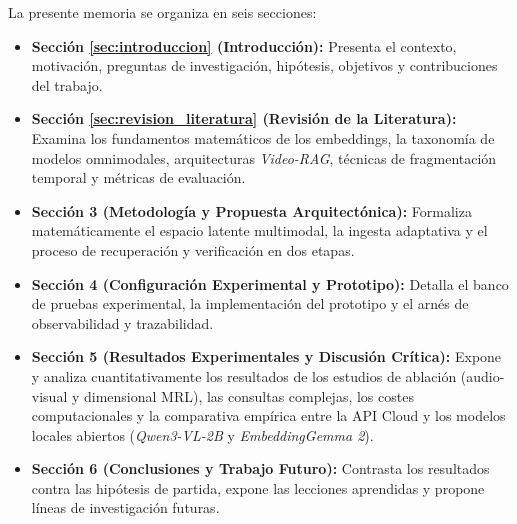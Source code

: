 La presente memoria se organiza en seis secciones:
\begin{itemize}
    \item \textbf{Sección \ref{sec:introduccion} (Introducción):} Presenta el contexto, motivación, preguntas de investigación, hipótesis, objetivos y contribuciones del trabajo.
    \item \textbf{Sección \ref{sec:revision_literatura} (Revisión de la Literatura):} Examina los fundamentos matemáticos de los embeddings, la taxonomía de modelos omnimodales, arquitecturas \textit{Video-RAG}, técnicas de fragmentación temporal y métricas de evaluación.
    \item \textbf{Sección 3 (Metodología y Propuesta Arquitectónica):} Formaliza matemáticamente el espacio latente multimodal, la ingesta adaptativa y el proceso de recuperación y verificación en dos etapas.
    \item \textbf{Sección 4 (Configuración Experimental y Prototipo):} Detalla el banco de pruebas experimental, la implementación del prototipo y el arnés de observabilidad y trazabilidad.
    \item \textbf{Sección 5 (Resultados Experimentales y Discusión Crítica):} Expone y analiza cuantitativamente los resultados de los estudios de ablación (audio-visual y dimensional MRL), las consultas complejas, los costes computacionales y la comparativa empírica entre la API Cloud y los modelos locales abiertos (\textit{Qwen3-VL-2B} y \textit{EmbeddingGemma 2}).
    \item \textbf{Sección 6 (Conclusiones y Trabajo Futuro):} Contrasta los resultados contra las hipótesis de partida, expone las lecciones aprendidas y propone líneas de investigación futuras.
\end{itemize}

